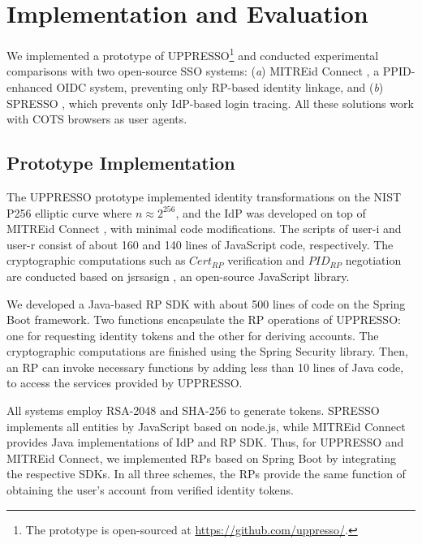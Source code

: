 \section{Implementation and Evaluation}
\label{sec:implementation}

We implemented a prototype of UPPRESSO\footnote{The prototype is open-sourced at \url{https://github.com/uppresso/}.} and conducted experimental comparisons with two open-source SSO systems:
 (\emph{a}) MITREid Connect \cite{MITREid}, a PPID-enhanced OIDC system, %
  preventing only RP-based identity linkage,
 and (\emph{b}) SPRESSO \cite{SPRESSO}, which prevents only IdP-based login tracing.
All these solutions work with COTS browsers as user agents.

\subsection{Prototype Implementation}
\label{subsec:proto-imple}

The UPPRESSO prototype implemented identity transformations on the NIST P256 elliptic curve where $n \approx 2^{256}$,
and the IdP was developed on top of MITREid Connect \cite{MITREid}, %
with minimal code modifications.
The scripts of user-i and user-r consist of about 160 and 140 lines of JavaScript code, respectively.  %
The cryptographic computations such as $Cert_{RP}$ verification and $PID_{RP}$ negotiation are conducted based on jsrsasign \cite{jsrsasign}, an open-source JavaScript library.

We developed a Java-based RP SDK with about 500 lines of code on the Spring Boot framework.
Two functions encapsulate the RP operations of UPPRESSO: one for requesting identity tokens and the other for deriving accounts. The cryptographic computations are finished using the Spring Security library.
Then, an RP can invoke necessary functions by adding less than 10 lines of Java code,
    to access the services provided by UPPRESSO.
    

All systems employ RSA-2048 and SHA-256 to generate tokens.
SPRESSO implements all entities by JavaScript based on node.js, while MITREid Connect provides Java implementations of IdP and RP SDK.
Thus, for UPPRESSO and MITREid Connect, we implemented RPs based on Spring Boot by integrating the respective SDKs. In all three schemes, the RPs provide the same function of obtaining the user's account from verified identity tokens.


